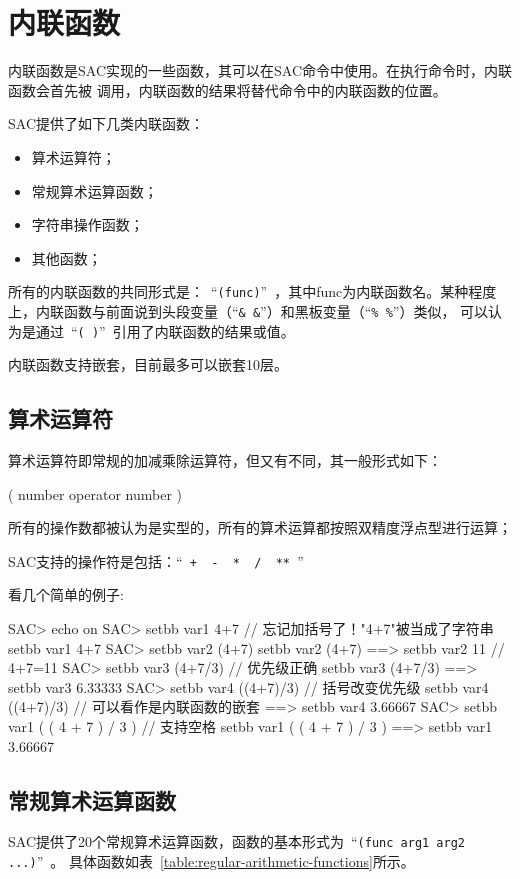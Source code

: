 \section{内联函数}

内联函数是SAC实现的一些函数，其可以在SAC命令中使用。在执行命令时，内联函数会首先被
调用，内联函数的结果将替代命令中的内联函数的位置。

SAC提供了如下几类内联函数：
\begin{itemize}
\item 算术运算符；
\item 常规算术运算函数；
\item 字符串操作函数；
\item 其他函数；
\end{itemize}

所有的内联函数的共同形式是：~``\lstinline{(func)}''~，其中func为内联函数名。某种程度
上，内联函数与前面说到头段变量（``\lstinline{& &}''）和黑板变量（``\lstinline{% %}''）类似，
可以认为是通过~``\lstinline{( )}''~引用了内联函数的结果或值。

内联函数支持嵌套，目前最多可以嵌套10层。

\subsection{算术运算符}
算术运算符即常规的加减乘除运算符，但又有不同，其一般形式如下：
\begin{SACCode}
    ( number operator number ) 
\end{SACCode}
所有的操作数都被认为是实型的，所有的算术运算都按照双精度浮点型进行运算；

SAC支持的操作符是包括：``\lstinline{ +  -  *  /  ** }''

看几个简单的例子:
\begin{SACCode}
SAC> echo on                
SAC> setbb var1 4+7             // 忘记加括号了！"4+7"被当成了字符串
 setbb var1 4+7
SAC> setbb var2 (4+7)           
 setbb var2 (4+7)
 ==>  setbb var2 11             // 4+7=11
SAC> setbb var3 (4+7/3)         // 优先级正确
 setbb var3 (4+7/3)
 ==>  setbb var3 6.33333
SAC> setbb var4 ((4+7)/3)       // 括号改变优先级
 setbb var4 ((4+7)/3)           // 可以看作是内联函数的嵌套
 ==>  setbb var4 3.66667
SAC> setbb var1 ( ( 4 + 7 ) / 3 )   // 支持空格
 setbb var1 ( ( 4 + 7 ) / 3 )
 ==>  setbb var1 3.66667
\end{SACCode}

\subsection{常规算术运算函数}
SAC提供了20个常规算术运算函数，函数的基本形式为~``\lstinline{(func arg1 arg2 ...)}''~。
具体函数如表~\ref{table:regular-arithmetic-functions}所示。


